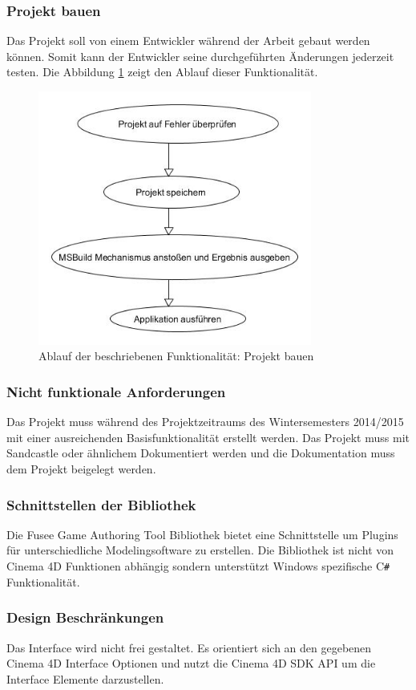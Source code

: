 \documentclass[pagesize, paper=a4, fontsize=12pt, titlepage=true, headings=small, headnosepline, abstractoff, liststotoc, nochapterprefix, plainheadsepline, twoside]{scrreprt}
\newcommand{\CSS}{C\texttt{\# }}
\begin{document}
\subsubsection{Projekt bauen}
Das Projekt soll von einem Entwickler während der Arbeit gebaut werden können. Somit kann der Entwickler seine durchgeführten Änderungen jederzeit testen. Die Abbildung \ref{re:projektbauen} zeigt den Ablauf dieser Funktionalität.
\begin{figure}[ht]
	\centering
	\includegraphics[width=9cm]{Bilder/ProjektBauen.jpg}
	\caption{Ablauf der beschriebenen Funktionalität: Projekt bauen}
	\label{re:projektbauen}
\end{figure}

\subsubsection{Nicht funktionale Anforderungen}
Das Projekt muss während des Projektzeitraums des Wintersemesters 2014/2015 mit einer ausreichenden Basisfunktionalität erstellt werden.
Das Projekt muss mit Sandcastle oder ähnlichem Dokumentiert werden und die Dokumentation muss dem Projekt beigelegt werden.

\subsubsection{Schnittstellen der Bibliothek}
Die Fusee Game Authoring Tool Bibliothek bietet eine Schnittstelle um Plugins für unterschiedliche Modelingsoftware zu erstellen. Die Bibliothek ist nicht von Cinema 4D Funktionen abhängig sondern unterstützt Windows spezifische \CSS Funktionalität. 

\subsubsection{Design Beschränkungen}
Das Interface wird nicht frei gestaltet. Es orientiert sich an den gegebenen Cinema 4D Interface Optionen und nutzt die Cinema 4D SDK API um die Interface Elemente darzustellen.
\end{document}
